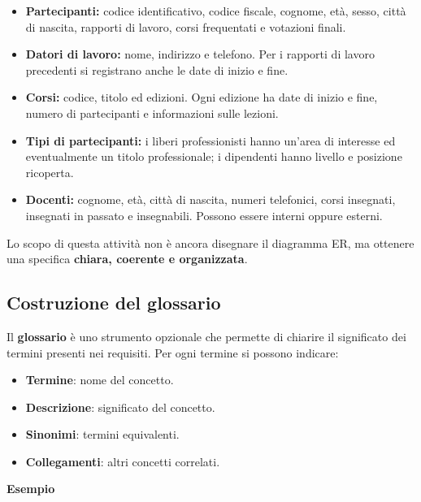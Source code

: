 \begin{itemize}
    \item \textbf{Partecipanti:}
    codice identificativo, codice fiscale, cognome,
    età, sesso, città di nascita, rapporti di lavoro,
    corsi frequentati e votazioni finali.

    \item \textbf{Datori di lavoro:}
    nome, indirizzo e telefono.
    Per i rapporti di lavoro precedenti si registrano
    anche le date di inizio e fine.

    \item \textbf{Corsi:}
    codice, titolo ed edizioni.
    Ogni edizione ha date di inizio e fine,
    numero di partecipanti e informazioni sulle lezioni.

    \item \textbf{Tipi di partecipanti:}
    i liberi professionisti hanno un'area di interesse
    ed eventualmente un titolo professionale;
    i dipendenti hanno livello e posizione ricoperta.

    \item \textbf{Docenti:}
    cognome, età, città di nascita, numeri telefonici,
    corsi insegnati, insegnati in passato
    e insegnabili.
    Possono essere interni oppure esterni.
\end{itemize}
\noindent
Lo scopo di questa attività non è ancora disegnare
il diagramma ER, ma ottenere una specifica
\textbf{chiara, coerente e organizzata}.


\subsection*{Costruzione del glossario}

Il \textbf{glossario} è uno strumento opzionale
che permette di chiarire il significato dei termini
presenti nei requisiti. Per ogni termine si possono indicare:

\begin{itemize}
    \item \textbf{Termine}: nome del concetto.
    \item \textbf{Descrizione}: significato del concetto.
    \item \textbf{Sinonimi}: termini equivalenti.
    \item \textbf{Collegamenti}: altri concetti correlati.
\end{itemize}

\medskip

\textcolor{verdeEsempio}{\textbf{Esempio}}

